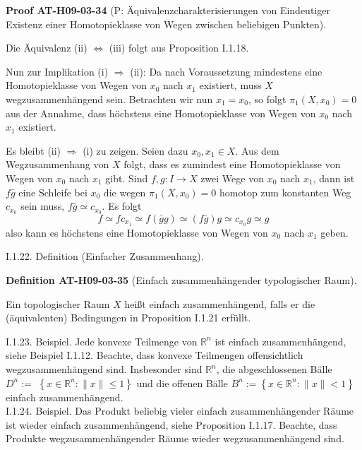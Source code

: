\documentclass[10pt, letterpaper]{article}
\newcommand{\CustomHeading}[3]{%
  \par\medskip\noindent%
  \textbf{#1 #2} \textnormal{(#3)}.\enskip%
}
\newenvironment{DEF}[2]{\begin{unitbox}\CustomHeading{Definition}{#1}{#2}}{\end{unitbox}}
\newenvironment{PROOF}[2]{\begin{unitbox}\CustomHeading{Proof}{#1}{#2}}{\end{unitbox}}
\begin{document}
\begin{PROOF}{AT-H09-03-34}{P: Äquivalenzcharakterisierungen von Eindeutiger Existenz einer Homotopieklasse von Wegen zwischen beliebigen Punkten}
Die Äquivalenz (ii) $\Leftrightarrow$ (iii) folgt aus Proposition I.1.18. 

Nun zur Implikation (i) $\Rightarrow$ (ii): Da nach Voraussetzung mindestens eine Homotopieklasse von Wegen von $x_{0}$ nach $x_{1}$ existiert, muss $X$ wegzusammenhängend sein. Betrachten wir nun $x_{1}=x_{0}$, so folgt $\pi_{1}\left(X, x_{0}\right)=0$ aus der Annahme, dass höchstens eine Homotopieklasse von Wegen von $x_{0}$ nach $x_{1}$ existiert. 

Es bleibt (ii) $\Rightarrow$ (i) zu zeigen. Seien dazu $x_{0}, x_{1} \in X$. Aus dem Wegzusammenhang von $X$ folgt, dass es zumindest eine Homotopieklasse von Wegen von $x_{0}$ nach $x_{1}$ gibt. Sind $f, g: I \rightarrow X$ zwei Wege von $x_{0}$ nach $x_{1}$, dann ist $f \bar{g}$ eine Schleife bei $x_{0}$ die wegen $\pi_{1}\left(X, x_{0}\right)=0$ homotop zum konstanten Weg $c_{x_{0}}$ sein muss, $f \bar{g} \simeq c_{x_{0}}$. Es folgt 
$$f \simeq f c_{x_{1}} \simeq f(\bar{g} g) \simeq(f \bar{g}) g \simeq c_{x_{0}} g \simeq g$$ 
also kann es höchstens eine Homotopieklasse von Wegen von $x_{0}$ nach $x_{1}$ geben.
\end{PROOF}



I.1.22. Definition (Einfacher Zusammenhang). 

\begin{DEF}{AT-H09-03-35}{Einfach zusammenhängender typologischer Raum}
Ein topologischer Raum $X$ heißt einfach zusammenhängend, falls er die (äquivalenten) Bedingungen in Proposition I.1.21 erfüllt.
\end{DEF}



I.1.23. Beispiel. Jede konvexe Teilmenge von $\mathbb{R}^{n}$ ist einfach zusammenhängend, siehe Beispiel I.1.12. Beachte, dass konvexe Teilmengen offensichtlich wegzusammenhängend sind. Insbesonder sind $\mathbb{R}^{n}$, die abgeschlossenen Bälle $D^{n}:=$ $\left\{x \in \mathbb{R}^{n}:\|x\| \leq 1\right\}$ und die offenen Bälle $B^{n}:=\left\{x \in \mathbb{R}^{n}:\|x\|<1\right\}$ einfach zusammenhängend.\\


I.1.24. Beispiel. Das Produkt beliebig vieler einfach zusammenhängender Räume ist wieder einfach zusammenhängend, siehe Proposition I.1.17. Beachte, dass Produkte wegzusammenhängender Räume wieder wegzusammenhängend sind.
\end{document}
